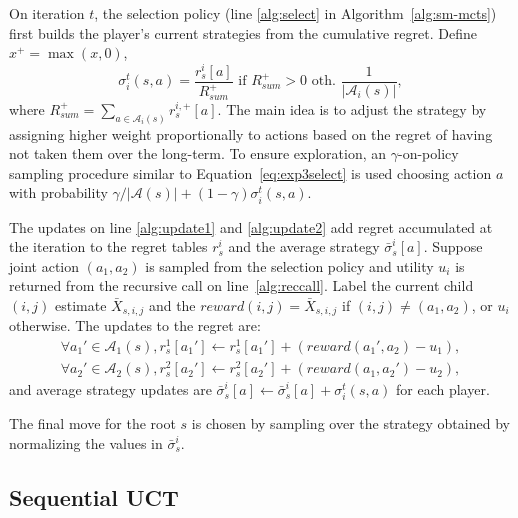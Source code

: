\documentclass[conference]{IEEEtran}
\newcommand{\cA}{\mathcal{A}}
\begin{document}
On iteration $t$, the selection policy (line \ref{alg:select} in Algorithm~\ref{alg:sm-mcts}) first builds 
the player's current strategies from the cumulative regret. Define $x^+ = \max(x,0)$,
\begin{equation}
\label{eq:rm}
\sigma^t_i(s,a) = \frac{r^i_s[a]}{R^+_{sum}} \mbox{ if } R^+_{sum} > 0 
\mbox{ oth. } \frac{1}{|\cA_i(s)|},  
\end{equation}
where $R^+_{sum} = \sum_{a \in \cA_i(s)}{r^{i,+}_s[a]}$. 
The main idea is to adjust the strategy by assigning higher weight proportionally to actions based on the regret of 
having not taken them over the long-term. 
To ensure exploration, an $\gamma$-on-policy sampling procedure similar to Equation~\ref{eq:exp3select} is used 
choosing action $a$ with probability $\gamma/|\cA(s)| + (1-\gamma) \sigma^t_i(s,a)$. 

The updates on line \ref{alg:update1} and \ref{alg:update2} add regret accumulated at the iteration to  
the regret tables $r^i_s$ and the average strategy $\bar{\sigma}^i_s[a]$. 
Suppose joint action $(a_1,a_2)$ is 
sampled from the selection policy and utility $u_i$ is returned from the recursive call on line~\ref{alg:reccall}. 
Label the current child $(i,j)$ estimate $\bar{X}_{s,i,j}$ and the $reward(i,j) = \bar{X}_{s,i,j}$ if 
$(i,j) \not= (a_1,a_2)$, or $u_i$ otherwise. The updates to the regret are:
\begin{eqnarray*}
\forall a_1' \in \cA_1(s),  r^1_s[a_1'] \leftarrow r^1_s[a_1'] + ( reward(a_1', a_2) - u_1 ),\\
\forall a_2' \in \cA_2(s),  r^2_s[a_2'] \leftarrow r^2_s[a_2'] + ( reward(a_1, a_2') - u_2 ),
\end{eqnarray*}
\noindent and average strategy updates are $\bar{\sigma}^i_s[a] \leftarrow \bar{\sigma}^i_s[a] + \sigma^t_i(s,a)$ 
for each player.

The final move for the root $s$ is chosen by sampling over the strategy obtained by 
normalizing the values in $\bar{\sigma}_s^i$. 

\subsection{Sequential UCT}

\end{document}
